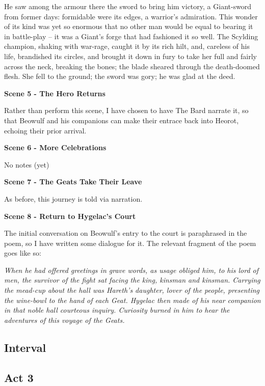 \documentclass[a4paper]{article}
\begin{document}
{{He saw among the armour there the sword to bring him victory,
a Giant-sword from former days: formidable were its edges,
a warrior’s admiration. This wonder of its kind
was yet so enormous that no other man
would be equal to bearing it in battle-play
– it was a Giant’s forge that had fashioned it so well.
The Scylding champion, shaking with war-rage,
caught it by its rich hilt, and, careless of his life,
brandished its circles, and brought it down in fury
to take her full and fairly across the neck,
breaking the bones; the blade sheared
through the death-doomed flesh. She fell to the ground;
the sword was gory; he was glad at the deed.}

\centerline{\textbf{Scene 5 - The Hero Returns}}

Rather than perform this scene, I have chosen to have
The Bard narrate it, so that Beowulf and his companions
can make their entrace back into Heorot, echoing their
prior arrival.

\centerline{\textbf{Scene 6 - More Celebrations}}

No notes (yet)

\centerline{\textbf{Scene 7 - The Geats Take Their Leave}}

As before, this journey is told via narration.

\centerline{\textbf{Scene 8 - Return to Hygelac's Court}}

The initial conversation on Beowulf's entry to the court is
paraphrased in the poem, so I have written some dialogue for it. 
The relevant fragment of the poem goes like so:

\textit{ When he had offered greetings in grave words,
as usage obliged him, to his lord of men,
the survivor of the fight sat facing the king,
kinsman and kinsman. Carrying the mead-cup
about the hall was Hareth’s daughter,
lover of the people, presenting the wine-bowl
to the hand of each Geat. Hygelac then made
of his near companion in that noble hall
courteous inquiry. Curiosity burned in him
to hear the adventures of this voyage of the Geats. }

\subsection{Interval}%

\subsection{Act 3}%

}
\end{document}
